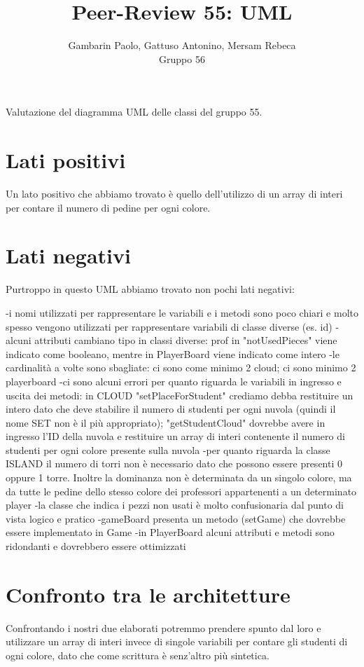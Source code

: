 \documentclass[12pt]{article}
\title{Peer-Review 55: UML}
\author{Gambarin Paolo, Gattuso Antonino, Mersam Rebeca\\Gruppo 56}
\begin{document}
\maketitle

Valutazione del diagramma UML delle classi del gruppo 55.

\section{Lati positivi}

Un lato positivo che abbiamo trovato è quello dell'utilizzo di un array di interi per contare il numero di pedine per ogni colore.

\section{Lati negativi}

Purtroppo in questo UML abbiamo trovato non pochi lati negativi:

        -i nomi utilizzati per rappresentare le variabili e i metodi sono poco chiari e molto spesso vengono utilizzati per rappresentare variabili di classe diverse (es. id)
        -alcuni attributi cambiano tipo in classi diverse: prof in "notUsedPieces" viene indicato come booleano, mentre in PlayerBoard viene indicato come intero
        -le cardinalità a volte sono sbagliate: ci sono come minimo 2 cloud; ci sono minimo 2 playerboard
        -ci sono alcuni errori per quanto riguarda le variabili in ingresso e uscita dei metodi: in CLOUD "setPlaceForStudent" crediamo debba restituire un intero dato che deve stabilire il numero
            di studenti per ogni nuvola (quindi il nome SET non è il più appropriato); "getStudentCloud" dovrebbe avere in ingresso l'ID della nuvola e restituire un array di interi contenente
            il numero di studenti per ogni colore presente sulla nuvola
        -per quanto riguarda la classe ISLAND il numero di torri non è necessario dato che possono essere presenti 0 oppure 1 torre. Inoltre la dominanza non è determinata da un singolo colore, ma da tutte
            le pedine dello stesso colore dei professori appartenenti a un determinato player
        -la classe che indica i pezzi non usati è molto confusionaria dal punto di vista logico e pratico
        -gameBoard presenta un metodo (setGame) che dovrebbe essere implementato in Game
        -in PlayerBoard alcuni attributi e metodi sono ridondanti e dovrebbero essere ottimizzati 

\section{Confronto tra le architetture}

Confrontando i nostri due elaborati potremmo prendere spunto dal loro e utilizzare un array di interi invece di singole variabili per contare gli studenti di ogni colore, 
dato che come scrittura è senz'altro più sintetica.
\end{document}
